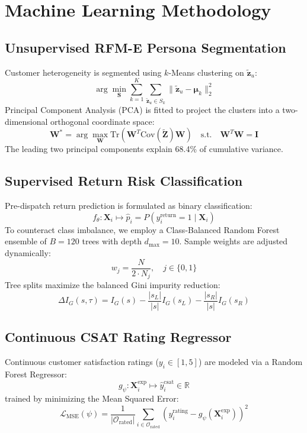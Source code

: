 \documentclass[conference]{IEEEtran}
\begin{document}
\section{Machine Learning Methodology}

\subsection{Unsupervised RFM-E Persona Segmentation}
Customer heterogeneity is segmented using $k$-Means clustering on $\tilde{\mathbf{z}}_u$:
\begin{equation}
\arg\min_{\mathbf{S}} \sum_{k=1}^K \sum_{\tilde{\mathbf{z}}_u \in S_k} \|\tilde{\mathbf{z}}_u - \mathbf{\mu}_k\|_2^2
\end{equation}
Principal Component Analysis (PCA) is fitted to project the clusters into a two-dimensional orthogonal coordinate space:
\begin{equation}
\mathbf{W}^* = \arg\max_{\mathbf{W}} \text{Tr}\left( \mathbf{W}^T \text{Cov}(\tilde{\mathbf{Z}}) \mathbf{W} \right) \quad \text{s.t.} \quad \mathbf{W}^T \mathbf{W} = \mathbf{I}
\end{equation}
The leading two principal components explain 68.4\% of cumulative variance.

\subsection{Supervised Return Risk Classification}
Pre-dispatch return prediction is formulated as binary classification:
\begin{equation}
f_{\theta}: \mathbf{X}_i \mapsto \hat{p}_i = P(y_i^{\text{return}} = 1 \mid \mathbf{X}_i)
\end{equation}
To counteract class imbalance, we employ a Class-Balanced Random Forest ensemble of $B=120$ trees with depth $d_{\max}=10$. Sample weights are adjusted dynamically:
\begin{equation}
w_j = \frac{N}{2 \cdot N_j}, \quad j \in \{0, 1\}
\end{equation}
Tree splits maximize the balanced Gini impurity reduction:
\begin{equation}
\Delta I_G(s, \tau) = I_G(s) - \frac{|s_L|}{|s|} I_G(s_L) - \frac{|s_R|}{|s|} I_G(s_R)
\end{equation}

\subsection{Continuous CSAT Rating Regressor}
Continuous customer satisfaction ratings ($y_i \in [1, 5]$) are modeled via a Random Forest Regressor:
\begin{equation}
g_{\psi}: \mathbf{X}_i^{\text{exp}} \mapsto \hat{y}_i^{\text{csat}} \in \mathbb{R}
\end{equation}
trained by minimizing the Mean Squared Error:
\begin{equation}
\mathcal{L}_{\text{MSE}}(\psi) = \frac{1}{|\mathcal{O}_{\text{rated}}|} \sum_{i \in \mathcal{O}_{\text{rated}}} \left( y_i^{\text{rating}} - g_{\psi}(\mathbf{X}_i^{\text{exp}}) \right)^2
\end{equation}
\end{document}
